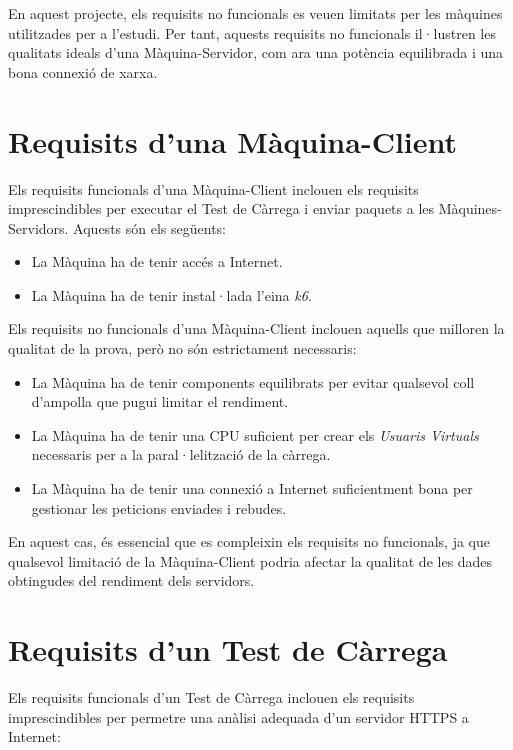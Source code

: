 En aquest projecte, els requisits no funcionals es veuen limitats per les màquines utilitzades per a l'estudi. Per tant, aquests requisits no funcionals il·lustren les qualitats ideals d'una Màquina-Servidor, com ara una potència equilibrada i una bona connexió de xarxa.

\section{Requisits d'una Màquina-Client}

Els requisits funcionals d'una Màquina-Client inclouen els requisits imprescindibles per executar el Test de Càrrega i enviar paquets a les Màquines-Servidors. Aquests són els següents:

\begin{itemize}
    \item La Màquina ha de tenir accés a Internet. 
    \item La Màquina ha de tenir instal·lada l'eina \textit{k6}.
\end{itemize}

Els requisits no funcionals d'una Màquina-Client inclouen aquells que milloren la qualitat de la prova, però no són estrictament necessaris:

\begin{itemize} 
    \item La Màquina ha de tenir components equilibrats per evitar qualsevol coll d'ampolla que pugui limitar el rendiment. 
    \item La Màquina ha de tenir una CPU suficient per crear els \textit{Usuaris Virtuals} necessaris per a la paral·lelització de la càrrega. 
    \item La Màquina ha de tenir una connexió a Internet suficientment bona per gestionar les peticions enviades i rebudes. 
\end{itemize}

En aquest cas, és essencial que es compleixin els requisits no funcionals, ja que qualsevol limitació de la Màquina-Client podria afectar la qualitat de les dades obtingudes del rendiment dels servidors.

\section{Requisits d'un Test de Càrrega}

Els requisits funcionals d'un Test de Càrrega inclouen els requisits imprescindibles per permetre una anàlisi adequada d'un servidor HTTPS a Internet:

